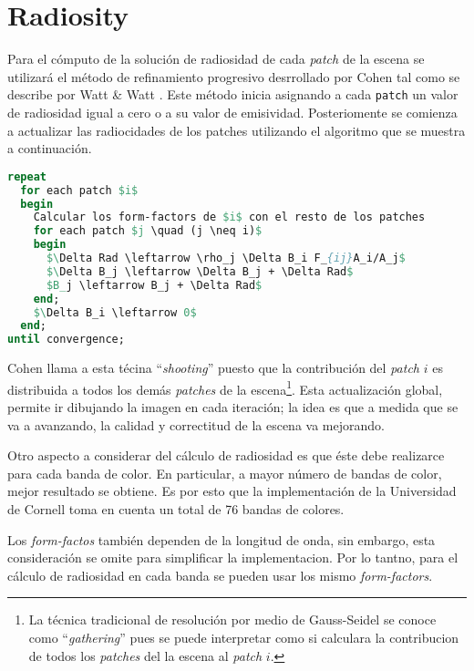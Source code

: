 \documentclass[letterpaper]{article}
\begin{document}

\section{Radiosity}
\label{sec:rad}
Para el cómputo de la solución de radiosidad de cada \textsl{patch} de
la escena se utilizará el método de refinamiento progresivo
desrrollado por Cohen \cite{cohen} tal como se describe por Watt \&
Watt \cite{Watt92}. Este método inicia asignando a cada \texttt{patch}
un valor de radiosidad igual a cero o a su valor de
emisividad. Posteriomente se comienza a actualizar las radiocidades de
los patches utilizando el algoritmo que se muestra a continuación.
\pagebreak{}
\begin{lstlisting}[language=pascal,frame=single,mathescape=True]
repeat 
  for each patch $i$
  begin
    Calcular los form-factors de $i$ con el resto de los patches
    for each patch $j \quad (j \neq i)$
    begin
      $\Delta Rad \leftarrow \rho_j \Delta B_i F_{ij}A_i/A_j$
      $\Delta B_j \leftarrow \Delta B_j + \Delta Rad$
      $B_j \leftarrow B_j + \Delta Rad$
    end;   
    $\Delta B_i \leftarrow 0$
  end;
until convergence;
\end{lstlisting}

Cohen llama a esta técina ``\textsl{shooting}'' puesto que la
contribución del \textsl{patch} $i$ es distribuida a todos los demás
\textsl{patches} de la escena\footnote{La técnica tradicional de
  resolución por medio de Gauss-Seidel se conoce como
  ``\textsl{gathering}'' pues se puede interpretar como si calculara
  la contribucion de todos los \textsl{patches} del la escena al
  \textsl{patch} $i$.}. Esta actualización global, permite ir dibujando
la imagen en cada iteración; la idea es que a medida que se va a
avanzando, la calidad y correctitud de la escena va mejorando.

Otro aspecto a considerar del cálculo de radiosidad es que éste debe
realizarce para cada banda de color.  En particular, a mayor número de
bandas de color, mejor resultado se obtiene. Es por esto que la
implementación de la Universidad de Cornell toma en cuenta un total
de 76 bandas de colores. 

Los \textsl{form-factos} también dependen de la longitud de onda, sin
embargo, esta consideración se omite para simplificar la
implementacion. Por lo tantno, para el cálculo de radiosidad en cada
banda se pueden usar los mismo \textsl{form-factors}.
\end{document}
